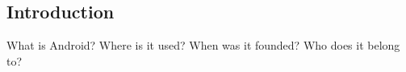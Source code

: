 \subsection{Introduction} \label{subsection:android-introduction}
What is Android? Where is it used? When was it founded? Who does it belong to?
